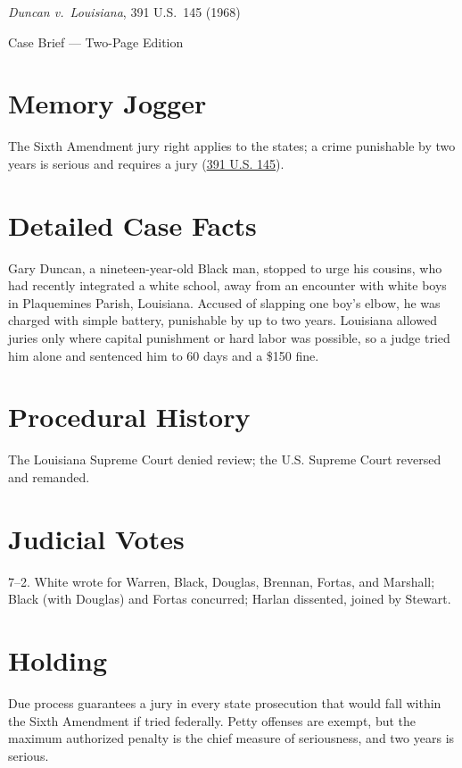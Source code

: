 \documentclass[12pt]{article}
\begin{document}
\begin{center}
{\LARGE \textit{Duncan v.\ Louisiana}, 391 U.S.\ 145 (1968)\par}
\vspace{0.5em}
{\large Case Brief --- Two-Page Edition\par}
\end{center}

\section{Memory Jogger}
The Sixth Amendment jury right applies to the states; a crime punishable by two years is serious and requires a jury (\href{https://supreme.justia.com/cases/federal/us/391/145/}{391 U.S. 145}).

\section{Detailed Case Facts}
Gary Duncan, a nineteen-year-old Black man, stopped to urge his cousins, who had recently integrated a white school, away from an encounter with white boys in Plaquemines Parish, Louisiana. Accused of slapping one boy's elbow, he was charged with simple battery, punishable by up to two years. Louisiana allowed juries only where capital punishment or hard labor was possible, so a judge tried him alone and sentenced him to 60 days and a \$150 fine.

\section{Procedural History}
The Louisiana Supreme Court denied review; the U.S. Supreme Court reversed and remanded.

\section{Judicial Votes}
7--2. White wrote for Warren, Black, Douglas, Brennan, Fortas, and Marshall; Black (with Douglas) and Fortas concurred; Harlan dissented, joined by Stewart.

\section{Holding}
Due process guarantees a jury in every state prosecution that would fall within the Sixth Amendment if tried federally. Petty offenses are exempt, but the maximum authorized penalty is the chief measure of seriousness, and two years is serious.
\end{document}

